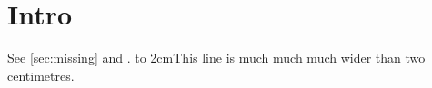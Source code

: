 \documentclass{article}
\begin{document}
\section{Intro}\label{sec:intro}

See \ref{sec:missing} and \cite{nokey}.
\noindent\hbox to 2cm{This line is much much much wider than two centimetres.}
\end{document}
